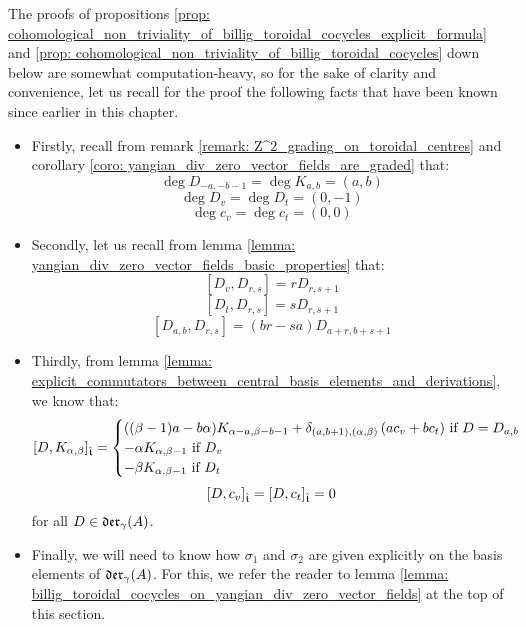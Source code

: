         \begin{remark}
            The proofs of propositions \ref{prop: cohomological_non_triviality_of_billig_toroidal_cocycles_explicit_formula} and \ref{prop: cohomological_non_triviality_of_billig_toroidal_cocycles} down below are somewhat computation-heavy, so for the sake of clarity and convenience, let us recall for the proof the following facts that have been known since earlier in this chapter.
            \begin{itemize}
                \item Firstly, recall from remark \ref{remark: Z^2_grading_on_toroidal_centres} and corollary \ref{coro: yangian_div_zero_vector_fields_are_graded} that:
                    $$\deg D_{-a, -b - 1} = \deg K_{a, b} = (a, b)$$
                    $$\deg D_v = \deg D_t = (0, -1)$$
                    $$\deg c_v = \deg c_t = (0, 0)$$
                \item Secondly, let us recall from lemma \ref{lemma: yangian_div_zero_vector_fields_basic_properties} that:
                    $$[D_v, D_{r, s}] = r D_{r, s + 1}$$
                    $$[D_t, D_{r, s}] = s D_{r, s + 1}$$
                    $$[D_{a, b}, D_{r, s}] = (br - sa) D_{a + r, b + s + 1}$$
                \item Thirdly, from lemma \ref{lemma: explicit_commutators_between_central_basis_elements_and_derivations}, we know that:
                    $$[D, K_{\alpha, \beta}]_{\hat{\mathfrak{t}}} =
                        \begin{cases}
                            \text{$((\beta - 1)a - b\alpha) K_{\alpha - a, \beta - b - 1} + \delta_{(a, b + 1), (\alpha, \beta)} \left( a c_v + b c_t \right)$ if $D = D_{a, b}$}
                            \\
                            \text{$-\alpha K_{\alpha, \beta - 1}$ if $D_v$}
                            \\
                            \text{$-\beta K_{\alpha, \beta - 1}$ if $D_t$}
                        \end{cases}
                    $$
                    $$[D, c_v]_{\hat{\mathfrak{t}}} = [D, c_t]_{\hat{\mathfrak{t}}} = 0$$
                for all $D \in \mathfrak{der}_{\gamma}(A)$.
                \item Finally, we will need to know how $\sigma_1$ and $\sigma_2$ are given explicitly on the basis elements of $\mathfrak{der}_{\gamma}(A)$. For this, we refer the reader to lemma \ref{lemma: billig_toroidal_cocycles_on_yangian_div_zero_vector_fields} at the top of this section.
            \end{itemize}
        \end{remark}
